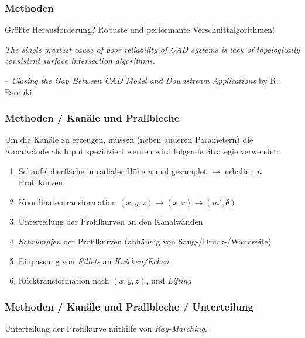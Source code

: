 \documentclass[8pt, aspectratio=169]{beamer}
\begin{document}
\begin{frame}
	\frametitle{Methoden}
	\vspace{-1cm}\hspace{-0.5cm}
	\begin{minipage}[t]{\textwidth}
		\begin{center}
		Größte Herausforderung? Robuste und performante Verschnittalgorithmen!
		\end{center}
		\vspace{0.5cm}
		\begin{center}
		\emph{The single greatest cause of poor reliability of CAD systems is lack of topologically consistent surface intersection algorithms.}
		\end{center}
		\vspace{0.5cm}
		\flushright -- \emph{Closing the Gap Between CAD Model and Downstream Applications} by R. Farouki
	\end{minipage}
\end{frame}

\begin{frame}
	\frametitle{Methoden / Kanäle und Prallbleche}
	\vspace{-1cm}\hspace{-0.5cm}
	\begin{minipage}[t]{\textwidth}
		Um die Kanäle zu erzeugen, müssen (neben anderen Parametern) die Kanalwände als Input spezifiziert werden
		wird folgende Strategie verwendet:
		\begin{enumerate}
			\item Schaufeloberfläche in radialer Höhe $n$ mal gesamplet $\rightarrow$ erhalten $n$ Profilkurven
			\item Koordinatentransformation $(x, y, z) \rightarrow (x, r) \rightarrow (m', \theta)$
			\item Unterteilung der Profilkurven an den Kanalwänden
			\item \emph{Schrumpfen} der Profilkurven (abhängig von Saug-/Druck-/Wandseite)
			\item Einpassung von \emph{Fillets} an \emph{Knicken/Ecken}
			\item Rücktransformation nach $(x, y, z)$, und \emph{Lifting}
		\end{enumerate}
	\end{minipage}
	\vfill
\end{frame}

\begin{frame}
	\frametitle{Methoden / Kanäle und Prallbleche / Unterteilung}
	\vspace{-1cm}\hspace{-0.5cm}
	\begin{minipage}[t]{.3\textwidth}
		Unterteilung der Profilkurve mithilfe von \emph{Ray-Marching}.
	\end{minipage}
	\begin{minipage}{.68\textwidth}
		\begin{figure}[H]
			\centering
			
		\end{figure}
	\end{minipage}
\end{frame}
\end{document}
